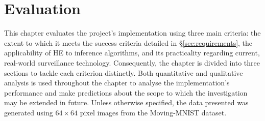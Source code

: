 \chapter{Evaluation}
\label{chap:evaluation}

\indent \indent
This chapter evaluates the project's implementation using three main criteria: the extent to which it meets the success criteria detailed in §\ref{sec:requirements},  the applicability of HE to inference algorithms, and its practicality regarding current, real-world surveillance technology. Consequently, the chapter is divided into three sections to tackle each criterion distinctly. Both quantitative and qualitative analysis is used throughout the chapter to analyse the implementation's performance and make predictions about the scope to which the investigation may be extended in future. Unless otherwise specified, the data presented was generated using $64 \times 64$ pixel images from the Moving-MNIST dataset.

